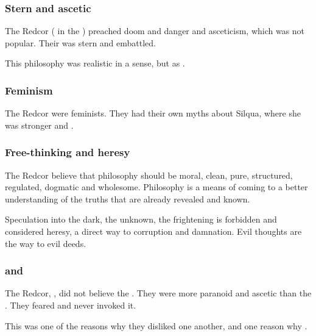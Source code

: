 \subsubsection{Stern and ascetic}
The Redcor ( in the ) preached doom and danger and asceticism, which was not popular. 
Their \iquin was stern and embattled. 

This philosophy was realistic in a sense, but  as . 





\subsubsection{Feminism}
The Redcor were feminists.
They had their own myths about Silqua, where she was stronger and . 





\subsubsection{Free-thinking and heresy}
The Redcor believe that philosophy should be moral, clean, pure, structured, regulated, dogmatic and wholesome. Philosophy is a means of coming to a better understanding of the truths that are already revealed and known. 

Speculation into the dark, the unknown, the frightening is forbidden and considered heresy, a direct way to corruption and damnation. Evil thoughts are the way to evil deeds.





\subsubsection{\Iquin and \Itzach}
The Redcor, , did not believe the . 
They were more paranoid and ascetic than the \Telcras. 
They feared \itzach and never invoked it. 

This was one of the reasons why they disliked one another, and one reason why .





